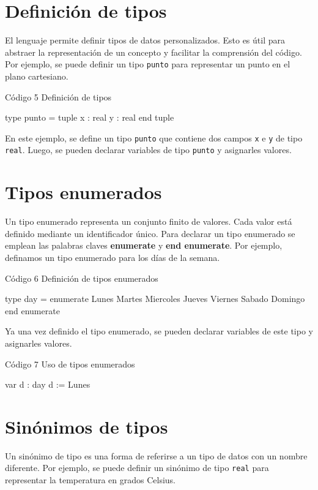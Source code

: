 \section{Definición de tipos}
El lenguaje permite definir tipos de datos personalizados. Esto es útil para abstraer la representación de un concepto y facilitar la comprensión del código. Por ejemplo, se puede definir un tipo \texttt{punto} para representar un punto en el plano cartesiano.

\begin{codebox}{Código 5}
\footnotesize Definición de tipos
\tcblower
\begin{pascallike}
type punto = tuple
                x : real
                y : real
                end tuple
\end{pascallike}
\end{codebox}
En este ejemplo, se define un tipo \texttt{punto} que contiene dos campos \texttt{x} e \texttt{y} de tipo \texttt{real}. Luego, se pueden declarar variables de tipo \texttt{punto} y asignarles valores.
\section{Tipos enumerados}
Un tipo enumerado representa un conjunto finito de valores. Cada valor está definido mediante un identificador único. Para declarar un tipo enumerado se emplean las palabras claves \textbf{enumerate} y \textbf{end enumerate}. Por ejemplo, definamos un tipo enumerado para los días de la semana.

\begin{codebox}{Código 6}
\footnotesize Definición de tipos enumerados
\tcblower
\begin{pascallike}
type day = enumerate
            Lunes
            Martes
            Miercoles
            Jueves
            Viernes
            Sabado
            Domingo
            end enumerate
\end{pascallike}
\end{codebox}
Ya una vez definido el tipo enumerado, se pueden declarar variables de este tipo y asignarles valores.

\begin{codebox}{Código 7}
\footnotesize Uso de tipos enumerados
\tcblower
\begin{pascallike}
var d : day
d := Lunes
\end{pascallike}
\end{codebox}

\section{Sinónimos de tipos}
Un sinónimo de tipo es una forma de referirse a un tipo de datos con un nombre diferente. Por ejemplo, se puede definir un sinónimo de tipo \texttt{real} para representar la temperatura en grados Celsius.

